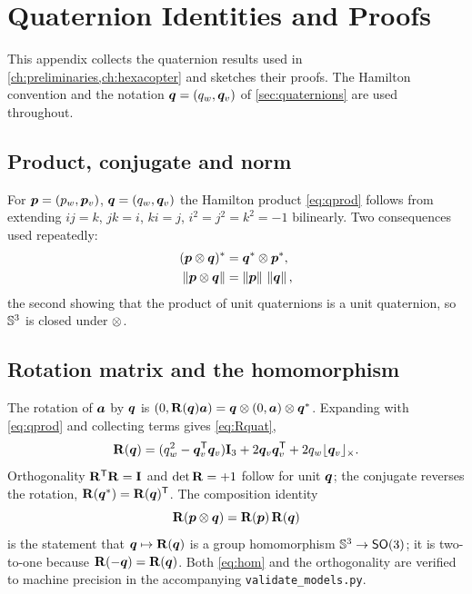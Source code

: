 \chapter{Quaternion Identities and Proofs}
\label{app:quat}

This appendix collects the quaternion results used in \cref{ch:preliminaries,ch:hexacopter}
and sketches their proofs. The Hamilton convention and the notation
$\bm{q}=(q_w,\bm{q}_v)$ of \cref{sec:quaternions} are used throughout.

\section*{Product, conjugate and norm}

For $\bm{p}=(p_w,\bm{p}_v)$, $\bm{q}=(q_w,\bm{q}_v)$ the Hamilton product
\cref{eq:qprod} follows from extending $ij=k$, $jk=i$, $ki=j$, $i^2=j^2=k^2=-1$
bilinearly. Two consequences used repeatedly:
\begin{align}
(\bm{p}\otimes\bm{q})^{\ast}&=\bm{q}^{\ast}\otimes\bm{p}^{\ast},\\
\left\lVert \bm{p}\otimes\bm{q} \right\rVert&=\left\lVert \bm{p} \right\rVert\,\left\lVert \bm{q} \right\rVert,
\end{align}
the second showing that the product of unit quaternions is a unit quaternion, so
$\mathbb{S}^3$ is closed under $\otimes$.

\section*{Rotation matrix and the homomorphism}

The rotation of $\bm{a}$ by $\bm{q}$ is $(0,\mathbf{R}(\bm{q})\bm{a})
=\bm{q}\otimes(0,\bm{a})\otimes\bm{q}^{\ast}$. Expanding with \cref{eq:qprod} and
collecting terms gives \cref{eq:Rquat},
\begin{equation}
\mathbf{R}(\bm{q})=(q_w^2-\bm{q}_v^{\mathsf{T}}\bm{q}_v)\mathbf{I}_3+2\bm{q}_v\bm{q}_v^{\mathsf{T}}+2q_w\lfloor \bm{q}_v \rfloor_{\times}.
\end{equation}
Orthogonality $\mathbf{R}^{\mathsf{T}}\mathbf{R}=\mathbf{I}$ and $\det\mathbf{R}=+1$ follow for unit
$\bm{q}$; the conjugate reverses the rotation,
$\mathbf{R}(\bm{q}^{\ast})=\mathbf{R}(\bm{q})^{\mathsf{T}}$. The composition identity
\begin{equation}
\mathbf{R}(\bm{p}\otimes\bm{q})=\mathbf{R}(\bm{p})\,\mathbf{R}(\bm{q})
\label{eq:hom}
\end{equation}
is the statement that $\bm{q}\mapsto\mathbf{R}(\bm{q})$ is a group homomorphism
$\mathbb{S}^3\to\mathsf{SO}(3)$; it is two-to-one because $\mathbf{R}(-\bm{q})=\mathbf{R}(\bm{q})$.
Both \cref{eq:hom} and the orthogonality are verified to machine precision in the
accompanying \texttt{validate\_models.py}.

